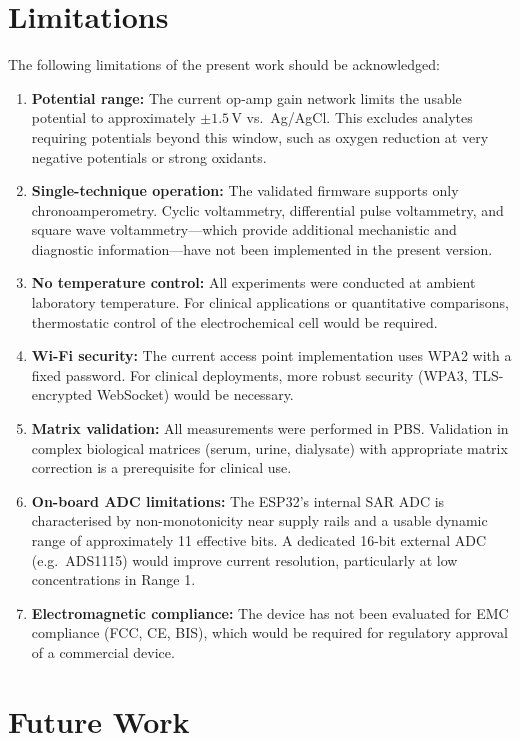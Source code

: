 \section{Limitations}
\label{sec:limitations}

The following limitations of the present work should be acknowledged:

\begin{enumerate}
    \item \textbf{Potential range:} The current op-amp gain network limits the usable potential to approximately $\pm 1.5$\,V vs.\ Ag/AgCl. This excludes analytes requiring potentials beyond this window, such as oxygen reduction at very negative potentials or strong oxidants.
    \item \textbf{Single-technique operation:} The validated firmware supports only chronoamperometry. Cyclic voltammetry, differential pulse voltammetry, and square wave voltammetry—which provide additional mechanistic and diagnostic information—have not been implemented in the present version.
    \item \textbf{No temperature control:} All experiments were conducted at ambient laboratory temperature. For clinical applications or quantitative comparisons, thermostatic control of the electrochemical cell would be required.
    \item \textbf{Wi-Fi security:} The current access point implementation uses WPA2 with a fixed password. For clinical deployments, more robust security (WPA3, TLS-encrypted WebSocket) would be necessary.
    \item \textbf{Matrix validation:} All measurements were performed in PBS. Validation in complex biological matrices (serum, urine, dialysate) with appropriate matrix correction is a prerequisite for clinical use.
    \item \textbf{On-board ADC limitations:} The ESP32's internal SAR ADC is characterised by non-monotonicity near supply rails and a usable dynamic range of approximately 11 effective bits. A dedicated 16-bit external ADC (e.g.\ ADS1115) would improve current resolution, particularly at low concentrations in Range 1.
    \item \textbf{Electromagnetic compliance:} The device has not been evaluated for EMC compliance (FCC, CE, BIS), which would be required for regulatory approval of a commercial device.
\end{enumerate}

\section{Future Work}
\label{sec:future}

